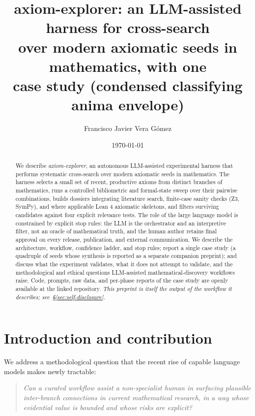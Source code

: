 \documentclass[11pt]{article}
\title{axiom-explorer: an LLM-assisted harness for cross-search\\
over modern axiomatic seeds in mathematics, with one\\
case study (condensed classifying anima envelope)}
\author[1]{Francisco Javier Vera G\'omez}
\affil[1]{Independent researcher\\
\href{https://orcid.org/0009-0001-3516-5871}{ORCID: 0009-0001-3516-5871}\\
Repository:
\href{https://github.com/Dredok/axiom-explorer}{github.com/Dredok/axiom-explorer}\\
Version: v1.0-preprint\\
DOI: \href{https://doi.org/10.5281/zenodo.20184068}{10.5281/zenodo.20184068}}
\date{\today}
\theoremstyle{definition}
\theoremstyle{remark}
\begin{document}
\maketitle

\begin{abstract}
We describe \emph{axiom-explorer}, an autonomous LLM-assisted experimental
harness that performs systematic cross-search over modern axiomatic seeds in
mathematics. The harness selects a small set of recent, productive axioms
from distinct branches of mathematics, runs a controlled bibliometric and
formal-state sweep over their pairwise combinations, builds dossiers
integrating literature search, finite-case sanity checks (Z3, SymPy), and
where applicable Lean 4 axiomatic skeletons, and filters surviving
candidates against four explicit relevance tests. The role of the large
language model is constrained by explicit stop rules: the LLM is the
orchestrator and an interpretive filter, not an oracle of mathematical
truth, and the human author retains final approval on every release,
publication, and external communication. We describe the architecture,
workflow, confidence ladder, and stop rules; report a single case study (a
quadruple of seeds whose synthesis is reported as a separate companion
preprint); and discuss what the experiment validates, what it does not
attempt to validate, and the methodological and ethical questions
LLM-assisted mathematical-discovery workflows raise. Code, prompts, raw
data, and per-phase reports of the case study are openly available at the
linked repository. \emph{This preprint is itself the output of the
workflow it describes; see~\S\ref{sec:self-disclosure}.}
\end{abstract}

\tableofcontents

\section{Introduction and contribution}\label{sec:intro}

We address a methodological question that the recent rise of capable
language models makes newly tractable:

\begin{quote}
\emph{Can a curated workflow assist a non-specialist human in surfacing
plausible inter-branch connections in current mathematical research, in
a way whose evidential value is bounded and whose risks are explicit?}
\end{quote}
\end{document}
